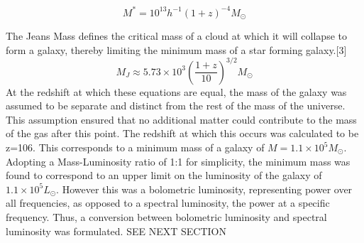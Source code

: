 \documentclass[pdf,color]{UoBnote}
\begin{document}
\begin{equation}
M^*=10^{13}h^{-1}(1+z)^{-4} M_\odot
\end{equation}

The Jeans Mass defines the critical mass of a cloud at which it will collapse to form a galaxy, thereby limiting the minimum mass of a star forming galaxy.[3]
\begin{equation}
M_J\approx 5.73\times10^3 \left (\frac{1+z}{10} \right )^{3/2} M_{\odot}
\end{equation}
At the redshift at which these equations are equal, the mass of the galaxy was assumed to be separate and distinct from the rest of the mass of the universe. This assumption ensured that no additional matter could contribute to the mass of the gas after this point. The redshift at which this occurs was calculated to be z=106. This corresponds to a minimum mass of a galaxy of $M=1.1\times10^5M_\odot$.\\
\newline
Adopting a Mass-Luminosity ratio of 1:1 for simplicity, the minimum mass was found to correspond to an upper limit on the luminosity of the galaxy of $1.1\times 10^5 L_\odot$. However this was a bolometric luminosity, representing power over all frequencies, as opposed to a spectral luminosity, the power at  a specific frequency. Thus, a conversion between bolometric luminosity and spectral luminosity was formulated. SEE NEXT SECTION
\end{document}
